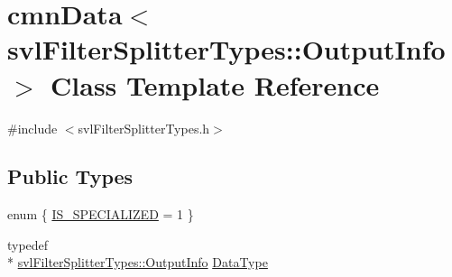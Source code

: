 \hypertarget{classcmn_data_3_01svl_filter_splitter_types_1_1_output_info_01_4}{\section{cmn\-Data$<$ svl\-Filter\-Splitter\-Types\-:\-:Output\-Info $>$ Class Template Reference}
\label{classcmn_data_3_01svl_filter_splitter_types_1_1_output_info_01_4}
}


{\ttfamily \#include $<$svl\-Filter\-Splitter\-Types.\-h$>$}

\subsection*{Public Types}
\begin{DoxyCompactItemize}
\item 
enum \{ \hyperlink{classcmn_data_3_01svl_filter_splitter_types_1_1_output_info_01_4_a029d96af3adec78f6f0cad3ddafffedca16a1a784e3773c10c5583a1bd935d699}{I\-S\-\_\-\-S\-P\-E\-C\-I\-A\-L\-I\-Z\-E\-D} = 1
 \}
\item 
typedef \\*
\hyperlink{classsvl_filter_splitter_types_1_1_output_info}{svl\-Filter\-Splitter\-Types\-::\-Output\-Info} \hyperlink{classcmn_data_3_01svl_filter_splitter_types_1_1_output_info_01_4_ad3099e3eeadaec326e214501ba10a222}{Data\-Type}
\end{DoxyCompactItemize}
